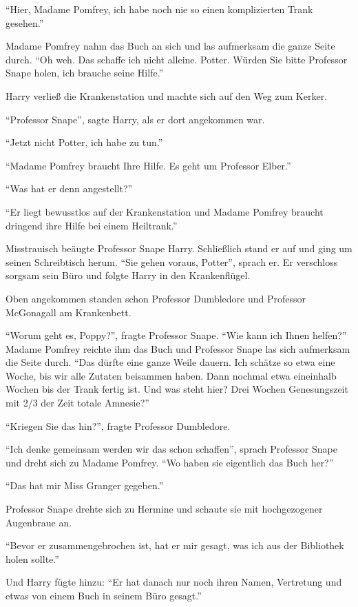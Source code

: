 \enquote{Hier, Madame Pomfrey, ich habe noch nie so einen komplizierten Trank gesehen.}

Madame Pomfrey nahm das Buch an sich und las aufmerksam die ganze Seite durch. \enquote{Oh weh. Das schaffe ich nicht alleine. Potter. Würden Sie bitte Professor Snape holen, ich brauche seine Hilfe.}

Harry verließ die Krankenstation und machte sich auf den Weg zum Kerker.

\enquote{Professor Snape\abs}, sagte Harry, als er dort angekommen war.

\enquote{Jetzt nicht Potter, ich habe zu tun.}

\enquote{\aabs Madame Pomfrey braucht Ihre Hilfe. Es geht um Professor Elber.}

\enquote{Was hat er denn angestellt?}

\enquote{Er liegt bewusstlos auf der Krankenstation und Madame Pomfrey braucht dringend ihre Hilfe bei einem Heiltrank.}

Misstrauisch beäugte Professor Snape Harry. Schließlich stand er auf und ging um seinen Schreibtisch herum. \enquote{Sie gehen voraus, Potter}, sprach er. Er verschloss sorgsam sein Büro und folgte Harry in den Krankenflügel.

Oben angekommen standen schon Professor Dumbledore und Professor McGonagall am Krankenbett.

\enquote{Worum geht es, Poppy?}, fragte Professor Snape. \enquote{Wie kann ich Ihnen helfen?} Madame Pomfrey reichte ihm das Buch und Professor Snape las sich aufmerksam die Seite durch. \enquote{Das dürfte eine ganze Weile dauern. Ich schätze so etwa eine Woche, bis wir alle Zutaten beisammen haben. Dann nochmal etwa eineinhalb Wochen bis der Trank fertig ist. Und was steht hier? Drei Wochen Genesungszeit mit 2/3 der Zeit totale Amnesie?}

\enquote{Kriegen Sie das hin?}, fragte Professor Dumbledore.

\enquote{Ich denke gemeinsam werden wir das schon schaffen}, sprach Professor Snape und dreht sich zu Madame Pomfrey. \enquote{Wo haben sie eigentlich das Buch her?}

\enquote{Das hat mir Miss Granger gegeben.}

Professor Snape drehte sich zu Hermine und schaute sie mit hochgezogener Augenbraue an.

\enquote{Bevor er zusammengebrochen ist, hat er mir gesagt, was ich aus der Bibliothek holen sollte.}

Und Harry fügte hinzu: \enquote{Er hat danach nur noch ihren Namen, Vertretung und etwas von einem Buch in seinem Büro gesagt.}

